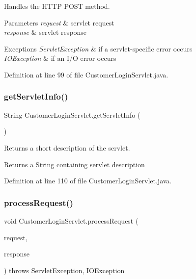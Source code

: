 Handles the H\+T\+TP {\ttfamily P\+O\+ST} method.


\begin{DoxyParams}{Parameters}
{\em request} & servlet request \\
\hline
{\em response} & servlet response \\
\hline
\end{DoxyParams}

\begin{DoxyExceptions}{Exceptions}
{\em Servlet\+Exception} & if a servlet-\/specific error occurs \\
\hline
{\em I\+O\+Exception} & if an I/O error occurs \\
\hline
\end{DoxyExceptions}


Definition at line 99 of file Customer\+Login\+Servlet.\+java.

\mbox{\label{class_customer_login_servlet_a7f98e5d3efa19e38f1fd188dd56af17c}} 
\subsubsection{\texorpdfstring{getServletInfo()}{getServletInfo()}}
{\footnotesize\ttfamily String Customer\+Login\+Servlet.\+get\+Servlet\+Info (\begin{DoxyParamCaption}{ }\end{DoxyParamCaption})}

Returns a short description of the servlet.

\begin{DoxyReturn}{Returns}
a String containing servlet description 
\end{DoxyReturn}


Definition at line 110 of file Customer\+Login\+Servlet.\+java.

\mbox{\label{class_customer_login_servlet_a0f003dcbdbf45a815eb54a01fb430677}} 
\subsubsection{\texorpdfstring{processRequest()}{processRequest()}}
{\footnotesize\ttfamily void Customer\+Login\+Servlet.\+process\+Request (\begin{DoxyParamCaption}\item[{Http\+Servlet\+Request}]{request,  }\item[{Http\+Servlet\+Response}]{response }\end{DoxyParamCaption}) throws Servlet\+Exception, I\+O\+Exception\hspace{0.3cm}{\ttfamily [protected]}}

